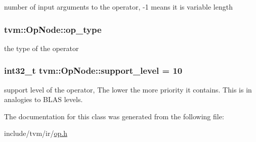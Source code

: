 number of input arguments to the operator, -\/1 means it is variable length 

\subsubsection[{\texorpdfstring{op\+\_\+type}{op_type}}]{ tvm\+::\+Op\+Node\+::op\+\_\+type\hspace{0.3cm}{\ttfamily [mutable]}}\hypertarget{classtvm_1_1OpNode_adff89c1e3f0aa6798a97fc4461293f7c}{}\label{classtvm_1_1OpNode_adff89c1e3f0aa6798a97fc4461293f7c}


the type of the operator 

\subsubsection[{\texorpdfstring{support\+\_\+level}{support_level}}]{\setlength{\rightskip}{0pt plus 5cm}int32\+\_\+t tvm\+::\+Op\+Node\+::support\+\_\+level = 10}\hypertarget{classtvm_1_1OpNode_a68a34098b5a111dec5f381cc4a80cb78}{}\label{classtvm_1_1OpNode_a68a34098b5a111dec5f381cc4a80cb78}


support level of the operator, The lower the more priority it contains. This is in analogies to B\+L\+AS levels. 



The documentation for this class was generated from the following file\+:\begin{DoxyCompactItemize}
\item 
include/tvm/ir/\hyperlink{ir_2op_8h}{op.\+h}\end{DoxyCompactItemize}
